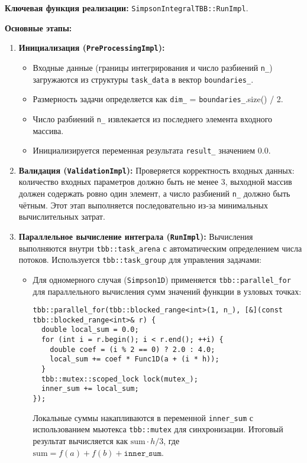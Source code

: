 \documentclass[12pt]{article}
\begin{document}
\textbf{Ключевая функция реализации:} \texttt{SimpsonIntegralTBB::RunImpl}.

\textbf{Основные этапы:}
\begin{enumerate}
  \item \textbf{Инициализация (\texttt{PreProcessingImpl}):}
  \begin{itemize}
    \item Входные данные (границы интегрирования и число разбиений \texttt{n\_}) загружаются из структуры \texttt{task\_data} в вектор \texttt{boundaries\_}.
    \item Размерность задачи определяется как \texttt{dim\_} = \texttt{boundaries\_}.size() / 2.
    \item Число разбиений \texttt{n\_} извлекается из последнего элемента входного массива.
    \item Инициализируется переменная результата \texttt{result\_} значением 0.0.
  \end{itemize}

  \item \textbf{Валидация (\texttt{ValidationImpl}):}
  Проверяется корректность входных данных: количество входных параметров должно быть не менее 3, выходной массив должен содержать ровно один элемент, а число разбиений \texttt{n\_} должно быть чётным. Этот этап выполняется последовательно из-за минимальных вычислительных затрат.

  \item \textbf{Параллельное вычисление интеграла (\texttt{RunImpl}):}
  Вычисления выполняются внутри \texttt{tbb::task\_arena} с автоматическим определением числа потоков. Используется \texttt{tbb::task\_group} для управления задачами:
  \begin{itemize}
    \item Для одномерного случая (\texttt{Simpson1D}) применяется \texttt{tbb::parallel\_for} для параллельного вычисления сумм значений функции в узловых точках:
    \begin{lstlisting}
tbb::parallel_for(tbb::blocked_range<int>(1, n_), [&](const tbb::blocked_range<int>& r) {
  double local_sum = 0.0;
  for (int i = r.begin(); i < r.end(); ++i) {
    double coef = (i % 2 == 0) ? 2.0 : 4.0;
    local_sum += coef * Func1D(a + (i * h));
  }
  tbb::mutex::scoped_lock lock(mutex_);
  inner_sum += local_sum;
});
    \end{lstlisting}
    Локальные суммы накапливаются в переменной \texttt{inner\_sum} с использованием мьютекса \texttt{tbb::mutex} для синхронизации. Итоговый результат вычисляется как $\text{sum} \cdot h / 3$, где $\text{sum} = f(a) + f(b) + \texttt{inner\_sum}$.


\end{itemize}
\end{enumerate}
\end{document}

